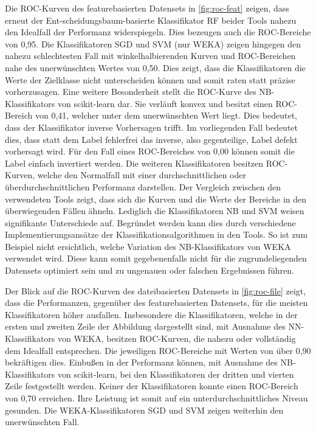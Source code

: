 Die ROC-Kurven des featurebasierten Datensets in \autoref{fig:roc-feat} zeigen, dass erneut der Ent-scheidungsbaum-basierte Klassifikator RF beider Tools nahezu den Idealfall der Performanz widerspiegeln. Dies bezeugen auch die ROC-Bereiche von 0,95. Die Klassifikatoren SGD und SVM (nur WEKA) zeigen hingegen den nahezu schlechtesten Fall mit winkelhalbierenden Kurven und ROC-Bereichen nahe des unerwünschten Wertes von 0,50. Dies zeigt, dass die Klassifikatoren die Werte der Zielklasse nicht unterscheiden können und somit \glqq raten\grqq{} statt präzise vorherzusagen. Eine weitere Besonderheit stellt die ROC-Kurve des NB-Klassifikators von scikit-learn dar. Sie verläuft konvex und besitzt einen ROC-Bereich von 0,41, welcher unter dem unerwünschten Wert liegt. Dies bedeutet, dass der Klassifikator inverse Vorhersagen trifft. Im vorliegenden Fall bedeutet dies, dass statt dem Label \glqq fehlerfrei\grqq{} das inverse, also gegenteilige, Label \glqq defekt\grqq{} vorhersagt wird. Für den Fall eines ROC-Bereiches von 0,00 können somit die Label einfach invertiert werden. Die weiteren Klassifikatoren besitzen ROC-Kurven, welche den Normalfall mit einer durchschnittlichen oder überdurchschnittlichen Performanz darstellen. Der Vergleich zwischen den verwendeten Tools zeigt, dass sich die Kurven und die Werte der Bereiche in den überwiegenden Fällen ähneln. Lediglich die Klassifikatoren NB und SVM weisen signifikante Unterschiede auf. Begründet werden kann dies durch verschiedene Implementierungsansätze der Klassifikationsalgorithmen in den Tools. So ist zum Beispiel nicht ersichtlich, welche Variation des NB-Klassifikators von WEKA verwendet wird. Diese kann somit gegebenenfalls nicht für die zugrundeliegenden Datensets optimiert sein und zu ungenauen oder falschen Ergebnissen führen.

Der Blick auf die ROC-Kurven des dateibasierten Datensets in \autoref{fig:roc-file} zeigt, dass die Performanzen, gegenüber des featurebasierten Datensets, für die meisten Klassifikatoren höher ausfallen. Insbesondere die Klassifikatoren, welche in der ersten und zweiten Zeile der Abbildung dargestellt sind, mit Ausnahme des NN-Klassifikators von WEKA, besitzen ROC-Kurven, die nahezu oder vollständig dem Idealfall entsprechen. Die jeweiligen ROC-Bereiche mit Werten von über 0,90 bekräftigen dies. Einbußen in der Performanz können, mit Ausnahme des NB-Klassifikators von scikit-learn, bei den Klassifikatoren der dritten und vierten Zeile festgestellt werden. Keiner der Klassifikatoren konnte einen ROC-Bereich von 0,70 erreichen. Ihre Leistung ist somit auf ein unterdurchschnittliches Niveau gesunden. Die WEKA-Klassifikatoren SGD und SVM zeigen weiterhin den unerwünschten Fall.

